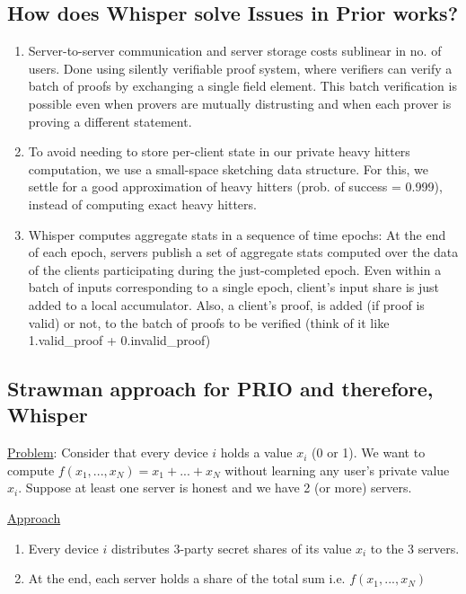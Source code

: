 \subsection{How does Whisper solve Issues in Prior works?}
\begin{enumerate}
    \item Server-to-server communication and server storage costs sublinear in no. of users. Done using silently verifiable proof system, where verifiers can verify a batch of proofs by exchanging a single field element. This batch verification is possible even when provers are mutually distrusting and when each prover is proving a different statement.
    \item To avoid needing to store per-client state in our private heavy hitters computation, we use a small-space sketching data structure. For this, we settle for a good approximation of heavy hitters (prob. of success = 0.999), instead of computing exact heavy hitters.
    \item Whisper computes aggregate stats in a sequence of time epochs: At the end of each epoch, servers publish a set of aggregate stats computed over the data of the clients participating during the just-completed epoch. Even within a batch of inputs corresponding to a single epoch, client's input share is just added to a local accumulator. Also, a client's proof, is added (if proof is valid) or not, to the batch of proofs to be verified (think of it like 1.valid\_proof + 0.invalid\_proof) 
\end{enumerate}

\subsection{Strawman approach for PRIO and therefore, Whisper}

\underline{Problem}: Consider that every device $i$ holds a value $x_i$ (0 or 1). We want to compute $f(x_1, ..., x_N) = x_1 + ... + x_N$ without learning any user's private value $x_i$. Suppose at least one server is honest and we have 2 (or more) servers. 

\noindent \underline{Approach}
\begin{enumerate}
    \item Every device $i$ distributes 3-party secret shares of its value $x_i$ to the 3 servers.
    \item At the end, each server holds a share of the total sum i.e. $f(x_1, ..., x_N)$
\end{enumerate}

